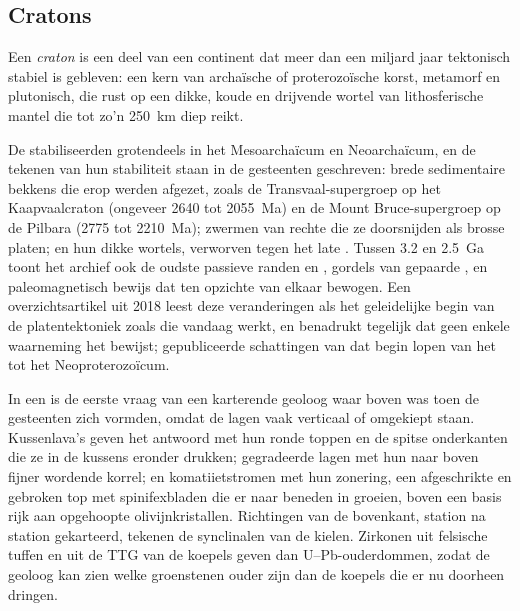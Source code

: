 \subsection*{Cratons}

\begin{definition}[Craton]\label{def:b2:precambrian-earth:craton}
Een \emph{craton} is een deel van een continent dat meer dan een miljard jaar tektonisch stabiel
is gebleven: een kern van archaïsche of proterozoïsche korst, metamorf en
plutonisch, die rust op een dikke, koude en drijvende wortel van lithosferische mantel die tot zo'n
\qty{250}{km} diep reikt.
\end{definition}

De  stabiliseerden grotendeels in het Mesoarchaïcum en Neoarchaïcum, en de tekenen van hun
stabiliteit staan in de gesteenten geschreven: brede sedimentaire bekkens die erop werden afgezet, zoals de
Transvaal-supergroep op het Kaapvaalcraton (ongeveer 2640 tot \qty{2055}{Ma}) en de Mount Bruce-supergroep
op de Pilbara (2775 tot \qty{2210}{Ma}); zwermen van rechte  die ze doorsnijden als
brosse platen; en hun dikke wortels, verworven tegen het late . Tussen 3.2 en
\qty{2.5}{Ga} toont het archief ook de oudste passieve randen en , gordels
van gepaarde , en paleomagnetisch bewijs dat  ten opzichte van elkaar bewogen.
Een overzichtsartikel uit 2018 leest deze veranderingen als het geleidelijke begin van de platentektoniek zoals die
vandaag werkt, en benadrukt tegelijk dat geen enkele waarneming het bewijst; gepubliceerde schattingen van dat
begin lopen van het  tot het Neoproterozoïcum.

\begin{inthefield}
In een  is de eerste vraag van een karterende geoloog waar boven was toen de
gesteenten zich vormden, omdat de lagen vaak verticaal of omgekiept staan. Kussenlava's geven het antwoord
met hun ronde toppen en de spitse onderkanten die ze in de kussens eronder drukken; gegradeerde lagen met
hun naar boven fijner wordende korrel; en komatiietstromen met hun zonering, een afgeschrikte en gebroken top met
spinifexbladen die er naar beneden in groeien, boven een basis rijk aan opgehoopte olivijnkristallen. Richtingen
van de bovenkant, station na station gekarteerd, tekenen de synclinalen van de kielen. Zirkonen uit felsische tuffen
en uit de TTG van de koepels geven dan U--Pb-ouderdommen, zodat de geoloog kan zien welke
groenstenen ouder zijn dan de koepels die er nu doorheen dringen.
\end{inthefield}

